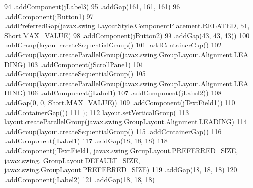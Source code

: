\begin{DoxyCode}
94                 .addComponent(\mbox{\hyperlink{classpecl3ignacioriberasemaforos_1_1_libreria_a8e5cccc84e9e79697bd6a0e06d1f5bcc}{jLabel3}})
95                 .addGap(161, 161, 161)
96                 .addComponent(\mbox{\hyperlink{classpecl3ignacioriberasemaforos_1_1_libreria_ae9afe865b26a1ef3fc5a8a9dbedfc319}{jButton1}})
97                 .addPreferredGap(javax.swing.LayoutStyle.ComponentPlacement.RELATED, 51, Short.MAX\_VALUE)
98                 .addComponent(\mbox{\hyperlink{classpecl3ignacioriberasemaforos_1_1_libreria_ac544c8592612a783615a2d8e7f58e4db}{jButton2}})
99                 .addGap(43, 43, 43))
100             .addGroup(layout.createSequentialGroup()
101                 .addContainerGap()
102                 .addGroup(layout.createParallelGroup(javax.swing.GroupLayout.Alignment.LEADING)
103                     .addComponent(\mbox{\hyperlink{classpecl3ignacioriberasemaforos_1_1_libreria_a0b0a7cf10b835445e40913dff41cd78d}{jScrollPane1}})
104                     .addGroup(layout.createSequentialGroup()
105                         .addGroup(layout.createParallelGroup(javax.swing.GroupLayout.Alignment.LEADING)
106                             .addComponent(\mbox{\hyperlink{classpecl3ignacioriberasemaforos_1_1_libreria_a36680cb4c901e0d6bba25a3b8803a92a}{jLabel1}})
107                             .addComponent(\mbox{\hyperlink{classpecl3ignacioriberasemaforos_1_1_libreria_a9362ca0b92689073199ca1afac99fa07}{jLabel2}}))
108                         .addGap(0, 0, Short.MAX\_VALUE))
109                     .addComponent(\mbox{\hyperlink{classpecl3ignacioriberasemaforos_1_1_libreria_a74a337cc4164c782f28eaafde5fa64c1}{jTextField1}}))
110                 .addContainerGap())
111         );
112         layout.setVerticalGroup(
113             layout.createParallelGroup(javax.swing.GroupLayout.Alignment.LEADING)
114             .addGroup(layout.createSequentialGroup()
115                 .addContainerGap()
116                 .addComponent(\mbox{\hyperlink{classpecl3ignacioriberasemaforos_1_1_libreria_a36680cb4c901e0d6bba25a3b8803a92a}{jLabel1}})
117                 .addGap(18, 18, 18)
118                 .addComponent(\mbox{\hyperlink{classpecl3ignacioriberasemaforos_1_1_libreria_a74a337cc4164c782f28eaafde5fa64c1}{jTextField1}}, javax.swing.GroupLayout.PREFERRED\_SIZE, javax.swing.
      GroupLayout.DEFAULT\_SIZE, javax.swing.GroupLayout.PREFERRED\_SIZE)
119                 .addGap(18, 18, 18)
120                 .addComponent(\mbox{\hyperlink{classpecl3ignacioriberasemaforos_1_1_libreria_a9362ca0b92689073199ca1afac99fa07}{jLabel2}})
121                 .addGap(18, 18, 18)

\end{DoxyCode}

